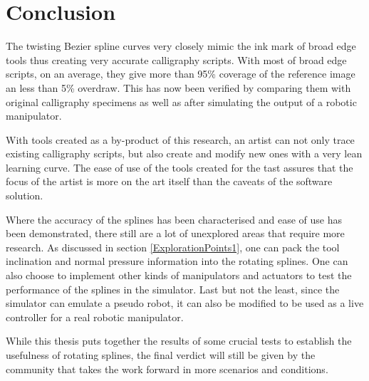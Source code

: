 \section{Conclusion} \label{Chapter:Conclusion}
{
    The twisting Bezier spline curves very closely mimic the ink mark of broad edge tools thus creating very accurate calligraphy scripts. With most of broad edge scripts, on an average, they give more than 95\% coverage of the reference image an less than 5\% overdraw. This has now been verified by comparing them with original calligraphy specimens as well as after simulating the output of a robotic manipulator.
    
    With tools created as a by-product of this research, an artist can not only trace existing calligraphy scripts, but also create and modify new ones with a very lean learning curve. The ease of use of the tools created for the tast assures that the focus of the artist is more on the art itself than the caveats of the software solution.
    
    Where the accuracy of the splines has been characterised and ease of use has been demonstrated, there still are a lot of unexplored areas that require more research. As discussed in section \ref{ExplorationPoints1}, one can pack the tool inclination and normal pressure information into the rotating splines. One can also choose to implement other kinds of manipulators and actuators to test the performance of the splines in the simulator. Last but not the least, since the simulator can emulate a pseudo robot, it can also be modified to be used as a live controller for a real robotic manipulator.
    
    While this thesis puts together the results of some crucial tests to establish the usefulness of rotating splines, the final verdict will still be given by the community that takes the work forward in more scenarios and conditions.
}
\clearpage 